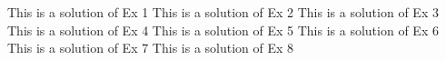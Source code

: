     \begin{multicols}{2}
        \begin{Answer}[ref={EX21}]
            \Question 
            \begin{tasks}
                \task This is a solution of Ex 1
                \task This is a solution of Ex 2 
                \task This is a solution of Ex 3 
                \task This is a solution of Ex 4 
                \task This is a solution of Ex 5 
                \task This is a solution of Ex 6 
                \task This is a solution of Ex 7 
                \task This is a solution of Ex 8 
            \end{tasks}
        \end{Answer}
    \end{multicols}
    \newpage        
